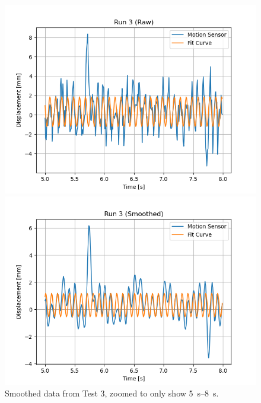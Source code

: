 \documentclass[12 pt]{report}
\begin{document}
\begin{figure}[htbp]
    \centering
    \begin{minipage}{0.45\textwidth}
        \centering
        \includegraphics[width=1.0\textwidth]{images/Graphs/Run_3-Raw-Zoomed} %
        \caption{Raw data from Test 3, zoomed to only show \qtyrange{5}{8}{\s}.}
        \label{fig:run_3-raw-zoomed}
    \end{minipage}\hfill
    \begin{minipage}{0.45\textwidth}
        \centering
        \includegraphics[width=1.0\textwidth]{images/Graphs/Run_3-Smoothed-Zoomed} %
        \caption{Smoothed data from Test 3, zoomed to only show \qtyrange{5}{8}{\s}.}
        \label{fig:run_3-smoothed-zoomed}
    \end{minipage}
\end{figure}
\end{document}
